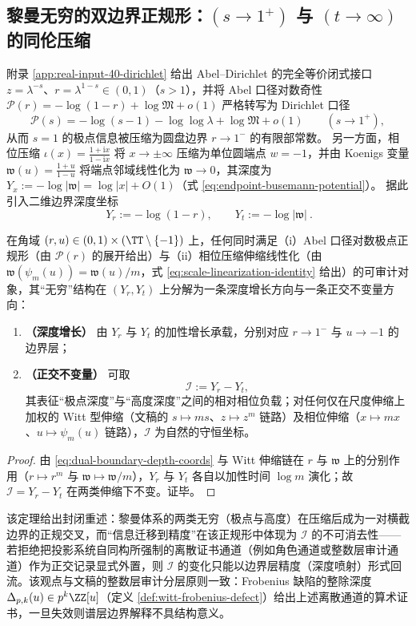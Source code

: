 \subsection{黎曼无穷的双边界正规形：\texorpdfstring{$(s\to 1^{+})$}{(s->1+)} 与 \texorpdfstring{$(t\to\infty)$}{(t->infty)} 的同伦压缩}\label{subsec:riemann-infinity-dual-boundary}
附录 \ref{app:real-input-40-dirichlet} 给出 Abel--Dirichlet 的完全等价闭式接口 \(z=\lambda^{-s}\)、\(r=\lambda^{1-s}\in(0,1)\)（\(s>1\)），并将 Abel 口径对数奇性 \(\mathcal{P}(r)=-\log(1-r)+\log\mathfrak{M}+o(1)\) 严格转写为 Dirichlet 口径
\[
\mathcal{P}(s)=-\log(s-1)-\log\log\lambda+\log\mathfrak{M}+o(1)\qquad(s\to 1^{+}),
\]
从而 \(s=1\) 的极点信息被压缩为圆盘边界 \(r\to 1^{-}\) 的有限部常数。
另一方面，相位压缩 \(\iota(x)=\frac{1+\mathrm{i}x}{1-\mathrm{i}x}\) 将 \(x\to\pm\infty\) 压缩为单位圆端点 \(w=-1\)，并由 Koenigs 变量 \(\mathfrak{w}(u)=\frac{1+u}{1-u}\) 将端点邻域线性化为 \(\mathfrak{w}\to 0\)，其深度为 \(Y_x:=-\log|\mathfrak{w}|=\log|x|+O(1)\)（式 \eqref{eq:endpoint-busemann-potential}）。
据此引入二维边界深度坐标
\begin{equation}\label{eq:dual-boundary-depth-coords}
\boxed{\ Y_r:=-\log(1-r),\qquad Y_t:=-\log|\mathfrak{w}|\ }.
\end{equation}

\begin{theorem}[双边界正规形与正交不变量]\label{thm:dual-boundary-normal-form}
在角域 \((r,u)\in(0,1)\times(\TT\setminus\{-1\})\) 上，任何同时满足（i）Abel 口径对数极点正规形（由 \(\mathcal{P}(r)\) 的展开给出）与（ii）相位压缩伸缩线性化（由 \(\mathfrak{w}(\psi_m(u))=\mathfrak{w}(u)/m\)，式 \eqref{eq:scale-linearization-identity} 给出）的可审计对象，其“无穷”结构在 \((Y_r,Y_t)\) 上分解为一条深度增长方向与一条正交不变量方向：
\begin{enumerate}
  \item \textbf{（深度增长）} 由 \(Y_r\) 与 \(Y_t\) 的加性增长承载，分别对应 \(r\to 1^{-}\) 与 \(u\to -1\) 的边界层；
  \item \textbf{（正交不变量）} 可取
  \[
  \mathcal{I}:=Y_r-Y_t,
  \]
  其表征“极点深度”与“高度深度”之间的相对相位负载；对任何仅在尺度伸缩上加权的 Witt 型伸缩（文稿的 \(s\mapsto ms\)、\(z\mapsto z^{m}\) 链路）及相位伸缩（\(x\mapsto mx\)、\(u\mapsto\psi_m(u)\) 链路），\(\mathcal{I}\) 为自然的守恒坐标。
\end{enumerate}
\end{theorem}
\begin{proof}
由 \eqref{eq:dual-boundary-depth-coords} 与 Witt 伸缩链在 \(r\) 与 \(\mathfrak{w}\) 上的分别作用（\(r\mapsto r^{m}\) 与 \(\mathfrak{w}\mapsto \mathfrak{w}/m\)），\(Y_r\) 与 \(Y_t\) 各自以加性时间 \(\log m\) 演化；故 \(\mathcal{I}=Y_r-Y_t\) 在两类伸缩下不变。证毕。
\end{proof}
该定理给出封闭重述：黎曼体系的两类无穷（极点与高度）在压缩后成为一对横截边界的正规交叉，而“信息迁移到精度”在该正规形中体现为 \(\mathcal{I}\) 的不可消去性——若拒绝把投影系统自同构所强制的离散证书通道（例如角色通道或整数层审计通道）作为正交记录显式外置，则 \(\mathcal{I}\) 的变化只能以边界层精度（深度喷射）形式回流。该观点与文稿的整数层审计分层原则一致：Frobenius 缺陷的整除深度 \(\Delta_{p,k}(u)\in p^k\ZZ[u]\)（定义 \ref{def:witt-frobenius-defect}）给出上述离散通道的算术证书，一旦失效则谱层边界解释不具结构意义。
